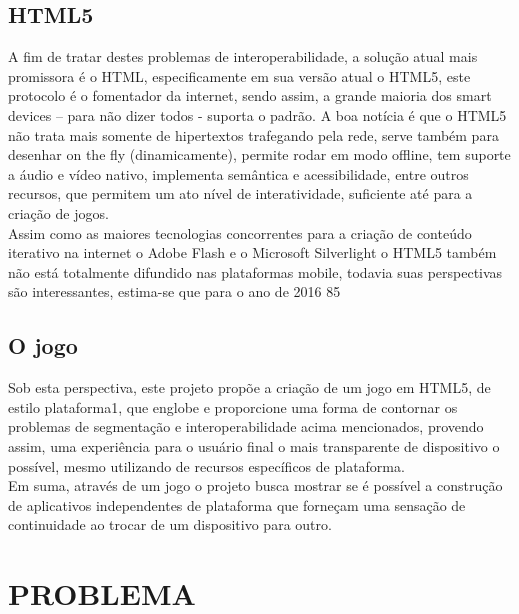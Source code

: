 \documentclass{article}
\begin{document}
\subsection{HTML5}
	A fim de tratar destes problemas de interoperabilidade, a solução atual mais promissora é o HTML, especificamente em sua versão atual o HTML5, este protocolo é o fomentador da internet, sendo assim, a grande maioria dos smart devices – para não dizer todos - suporta o padrão. A boa notícia é que o HTML5 não trata mais somente de hipertextos trafegando pela rede, serve também para desenhar on the fly (dinamicamente), permite rodar em modo offline, tem suporte a áudio e vídeo nativo, implementa semântica e acessibilidade, entre outros recursos, que permitem um ato nível de interatividade, suficiente até para a criação de jogos. 
\\
	Assim como as  maiores tecnologias concorrentes para a criação de conteúdo iterativo na internet o Adobe Flash e o Microsoft Silverlight o HTML5 também não está totalmente difundido nas plataformas mobile, todavia suas perspectivas são interessantes, estima-se que para o ano de 2016 85%

\subsection{O jogo}

Sob esta perspectiva, este projeto propõe  a criação de um jogo em HTML5, de estilo plataforma1, que englobe e proporcione uma forma de contornar os problemas de segmentação e interoperabilidade acima mencionados, provendo assim, uma experiência para o usuário final o mais transparente de dispositivo o possível, mesmo utilizando de recursos específicos de plataforma.  
\\
	Em suma, através de um jogo o projeto busca mostrar se é possível a construção de aplicativos independentes de plataforma que forneçam uma sensação de continuidade ao trocar de um dispositivo para outro.  

\section{PROBLEMA}
\end{document}
